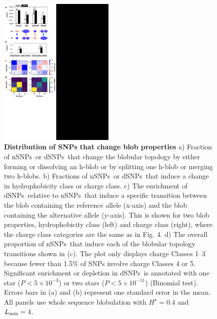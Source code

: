 \documentclass[9pt,twocolumn,twoside,lineno]{pnas-new}
\newcommand{\dSNPs}{dSNPs~}
\newcommand{\nSNPs}{nSNPs~}
\newcommand{\hydrochar}{hydrophobicity class}
\newcommand{\chargechar}{charge class}
\newcommand{\Ht}{H^{\star}}
\newcommand{\Lmin}{L_{\rm min}}
\begin{document}
\begin{figure}
\includegraphics[width=0.5\textwidth,trim={0 0cm 0 0cm},clip]{fig5.pdf}
\caption{{\bf Distribution of SNPs that change blob properties}  a) Fraction of \nSNPs or \dSNPs that change the blobular topology by either forming or dissolving an h-blob or by splitting one h-blob or merging two h-blobs. b) Fractions of \nSNPs or \dSNPs that induce a change in \hydrochar{} or \chargechar.  c) The enrichment of \dSNPs relative to \nSNPs that induce a specific transition between the blob containing the reference allele (x-axis) and the blob containing the alternative allele (y-axis). This is shown for two blob properties, \hydrochar{} (left) and \chargechar{} (right), where the \chargechar{} categories are the same as in Fig. 4. d) The overall proportion of \nSNPs that induce each of the blobular topology transitions shown in (c). The plot only displays charge Classes 1--3 because fewer than 1.5\% of SNPs involve charge Classes 4 or 5.
Significant enrichment or depletion in \dSNPs is annotated with one star ($P< 5\times 10^{-3}$) or two stars ($P< 5\times 10^{-11}$) (Binomial test). Errors bars in (a) and (b) represent one standard error in the mean. All panels use whole sequence blobulation with $\Ht=0.4$ and $\Lmin=4$.}
\label{c3_h_p_enrich}
\end{figure}
\end{document}
